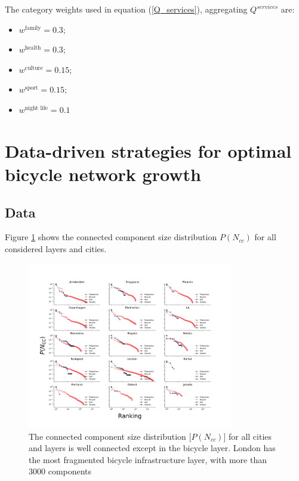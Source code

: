 The category weights used in equation (\ref{Q_services}), aggregating $Q^{services}$ are:

\begin{itemize}
  \item $w^{\text{family}}= 0.3$;
  \item $w^{\text{health}}= 0.3$;
  \item $w^{\text{culture}} = 0.15$;
  \item $w^{\text{sport}} = 0.15$;
  \item $w^{\text{night life}}=0.1$
\end{itemize}

\section{Data-driven strategies for optimal bicycle network growth}
\subsection{Data}

Figure \ref{fig:Nodes} shows the connected component size distribution $P(N_{cc})$ for all considered layers and cities.

\begin{figure}[h!]
  \centering
  \includegraphics[width=0.8\textwidth]{images/datadriven/Nodes_cc.png}
  \caption[Connected component size distribution for analyzed cities]{The connected component size distribution [$P(N_{cc})$] for all cities and layers is well connected except in the bicycle layer. London has the most fragmented bicycle infrastructure layer, with more than 3000 components}
  \label{fig:Nodes}
\end{figure}


